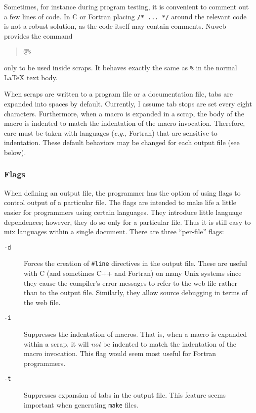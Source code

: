\documentclass{report}
\begin{document}
Sometimes, for instance during program testing, it is convenient to comment
out a few lines of code. In C or Fortran placing \verb|/* ... */| around the relevant
code is not a robust solution, as the code itself may contain 
comments. Nuweb provides the command
\begin{quote}
\verb|@%| 
\end{quote}only to be used inside scraps. It behaves exactly the same 
as \verb|%| in the normal {\LaTeX} text body. 

When scraps are written to a program file or a documentation file, tabs are
expanded into spaces by default. Currently, I assume tab stops are set
every eight characters. Furthermore, when a macro is expanded in a scrap,
the body of the macro is indented to match the indentation of the
macro invocation. Therefore, care must be taken with languages 
({\em e.g.,} Fortran) that are sensitive to indentation.
These default behaviors may be changed for each output file (see
below).

\subsubsection{Flags}

When defining an output file, the programmer has the option of using
flags to control output of a particular file. The flags are intended
to make life a little easier for programmers using certain languages.
They introduce little language dependences; however, they do so only
for a particular file. Thus it is still easy to mix languages within a
single document. There are three ``per-file'' flags:
\begin{description}
\item[\tt -d] Forces the creation of \verb|#line| directives in the
  output file. These are useful with C (and sometimes C++ and Fortran) on
  many Unix systems since they cause the compiler's error messages to
  refer to the web file rather than to the output file. Similarly, they
  allow source debugging in terms of the web file.
\item[\tt -i] Suppresses the indentation of macros. That is, when a
  macro is expanded within a scrap, it will {\em not\/} be indented to
  match the indentation of the macro invocation. This flag would seem
  most useful for Fortran programmers.
\item[\tt -t] Suppresses expansion of tabs in the output file. This
  feature seems important when generating \verb|make| files.
\end{description}
\end{document}
